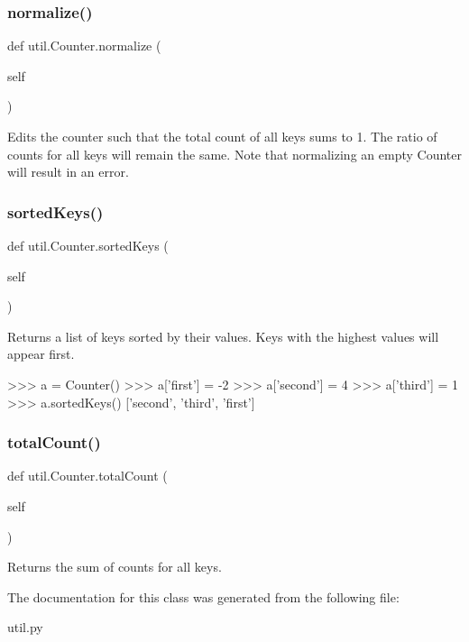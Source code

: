 \subsubsection{\texorpdfstring{normalize()}{normalize()}}
{\footnotesize\ttfamily def util.\+Counter.\+normalize (\begin{DoxyParamCaption}\item[{}]{self }\end{DoxyParamCaption})}

\begin{DoxyVerb}Edits the counter such that the total count of all
keys sums to 1.  The ratio of counts for all keys
will remain the same. Note that normalizing an empty 
Counter will result in an error.
\end{DoxyVerb}
 \mbox{\label{classutil_1_1_counter_a8e32d106f34cb7cd8341e78b49f5e40a}} 
\subsubsection{\texorpdfstring{sorted\+Keys()}{sortedKeys()}}
{\footnotesize\ttfamily def util.\+Counter.\+sorted\+Keys (\begin{DoxyParamCaption}\item[{}]{self }\end{DoxyParamCaption})}

\begin{DoxyVerb}Returns a list of keys sorted by their values.  Keys
with the highest values will appear first.

>>> a = Counter()
>>> a['first'] = -2
>>> a['second'] = 4
>>> a['third'] = 1
>>> a.sortedKeys()
['second', 'third', 'first']
\end{DoxyVerb}
 \mbox{\label{classutil_1_1_counter_a452a24a68fa547c7bf56e619be6bab6d}} 
\subsubsection{\texorpdfstring{total\+Count()}{totalCount()}}
{\footnotesize\ttfamily def util.\+Counter.\+total\+Count (\begin{DoxyParamCaption}\item[{}]{self }\end{DoxyParamCaption})}

\begin{DoxyVerb}Returns the sum of counts for all keys.
\end{DoxyVerb}
 

The documentation for this class was generated from the following file\+:\begin{DoxyCompactItemize}
\item 
util.\+py\end{DoxyCompactItemize}
